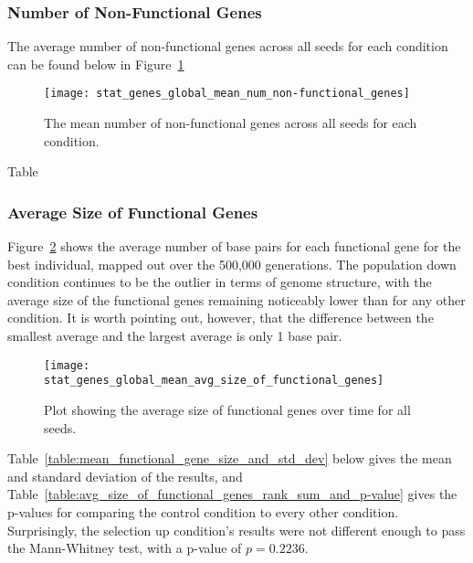 \subsubsection{Number of Non-Functional Genes}
The average number of non-functional genes across all seeds for each condition can be found below in Figure~\ref{fig:mean_num_non-functional_genes}

\begin{figure}[H]
	\centering
	\texttt{[image: stat\_genes\_global\_mean\_num\_non-functional\_genes]}
	\caption[Mean number of non-functional genes]{The mean number of non-functional genes across all seeds for each condition.}
	\label{fig:mean_num_non-functional_genes}
\end{figure}

Table 

\subsubsection{Average Size of Functional Genes}\label{sec:average_size_functional_genes}
Figure~\ref{fig:mean_functional_gene_size} shows the average number of base pairs for each functional gene for the best individual, mapped out over the 500,000 generations. The population down condition continues to be the outlier in terms of genome structure, with the average size of the functional genes remaining noticeably lower than for any other condition. It is worth pointing out, however, that the difference between the smallest average and the largest average is only 1 base pair. 
\begin{figure}[H]
	\centering
	\texttt{[image: stat\_genes\_global\_mean\_avg\_size\_of\_functional\_genes]}
	\caption[Average size of functional genes]{Plot showing the average size of functional genes over time for all seeds.}
	\label{fig:mean_functional_gene_size}
\end{figure}
Table~\ref{table:mean_functional_gene_size_and_std_dev} below gives the mean and standard deviation of the results, and Table~\ref{table:avg_size_of_functional_genes_rank_sum_and_p-value} gives the p-values for comparing the control condition to every other condition. Surprisingly, the selection up condition's results were not different enough to pass the Mann-Whitney test, with a p-value of $p = 0.2236$. 

